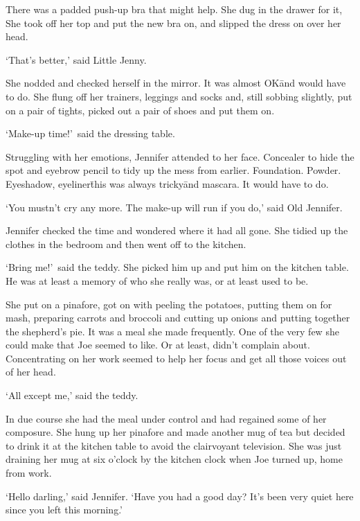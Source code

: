 There was a padded push-up bra that might help. She dug in the 
drawer for it, She took off her top and put the new bra on, and 
slipped the dress on over her head.

`That's better,' said Little Jenny.

She nodded and checked herself in the mirror. It was almost 
OK\=and would have to do. She flung off her trainers, leggings and 
socks and, still sobbing slightly, put on a pair of tights, picked 
out a pair of shoes and put them on.

`Make-up time!'~said the dressing table.

Struggling with her emotions, Jennifer attended to her face. 
Concealer to hide the spot and eyebrow pencil to tidy up the mess 
from earlier. Foundation. Powder. Eyeshadow, eyeliner\=this was 
always tricky\=and mascara. It would have to do.

`You mustn't cry any more. The make-up will run if you do,' said 
Old Jennifer.

Jennifer checked the time and wondered where it had all gone. She 
tidied up the clothes in the bedroom and then went off to the 
kitchen.

`Bring me!'~said the teddy. She picked him up and put him on the 
kitchen table. He was at least a memory of who she really was, or 
at least used to be.

She put on a pinafore, got on with peeling the potatoes, putting 
them on for mash, preparing carrots and broccoli and cutting up 
onions and putting together the shepherd's pie. It was a meal she 
made frequently. One of the very few she could make that Joe 
seemed to like. Or at least, didn't complain about. Concentrating 
on her work seemed to help her focus and get all those voices out 
of her head.

`All except me,' said the teddy.

In due course she had the meal under control and had regained some 
of her composure. She hung up her pinafore and made another mug of 
tea but decided to drink it at the kitchen table to avoid the 
clairvoyant television. She was just draining her mug at six 
o'clock by the kitchen clock when Joe turned up, home from work.

`Hello darling,' said Jennifer. `Have you had a good day? It's
been very quiet here since you left this morning.'



